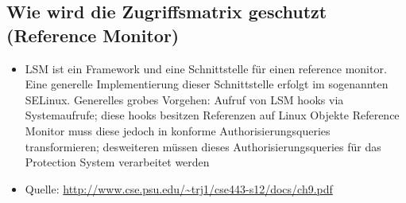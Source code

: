 \documentclass{scrartcl}
\begin{document}
\subsection*{Wie wird die Zugriffsmatrix geschutzt (Reference Monitor)}

\begin{itemize}
  \item LSM ist ein Framework und eine Schnittstelle für einen reference monitor. Eine generelle 
  Implementierung dieser Schnittstelle erfolgt im sogenannten SELinux. Generelles grobes Vorgehen: 
  Aufruf von LSM hooks via Systemaufrufe; diese hooks besitzen Referenzen auf Linux Objekte 
  Reference Monitor muss diese jedoch in konforme Authorisierungsqueries
  transformieren; desweiteren müssen dieses Authorisierungsqueries für das Protection System 
  verarbeitet werden
  \item Quelle: \url{http://www.cse.psu.edu/~trj1/cse443-s12/docs/ch9.pdf}
\end{itemize}
\end{document}
